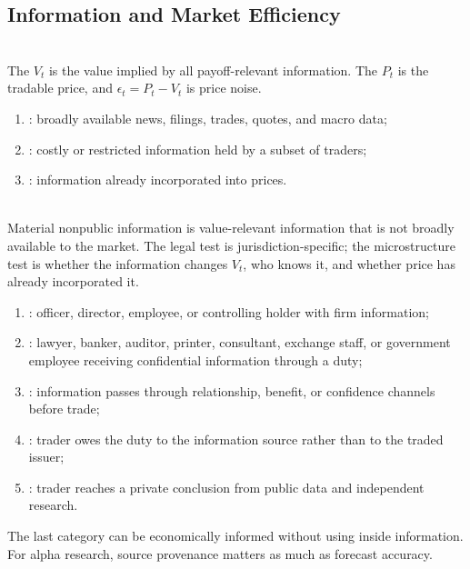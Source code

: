 \subsection{Information and Market Efficiency}

\begin{definition} \\
The  $V_t$ is the value implied by all payoff-relevant information. The  $P_t$ is the tradable price, and $\epsilon_t=P_t-V_t$ is price noise.
\end{definition}

\begin{taxonomy} 
\begin{enumerate}[label=\roman*.]
\setlength{\itemsep}{0pt}
\item {}: broadly available news, filings, trades, quotes, and macro data;
\item {}: costly or restricted information held by a subset of traders;
\item {}: information already incorporated into prices.
\end{enumerate}
\end{taxonomy}

\begin{definition} \\
Material nonpublic information is value-relevant information that is not broadly available to the market. The legal test is jurisdiction-specific; the microstructure test is whether the information changes $V_t$, who knows it, and whether price has already incorporated it.
\end{definition}

\begin{taxonomy} 
\begin{enumerate}[label=\roman*.]
\setlength{\itemsep}{0pt}
\item {}: officer, director, employee, or controlling holder with firm information;
\item {}: lawyer, banker, auditor, printer, consultant, exchange staff, or government employee receiving confidential information through a duty;
\item {}: information passes through relationship, benefit, or confidence channels before trade;
\item {}: trader owes the duty to the information source rather than to the traded issuer;
\item {}: trader reaches a private conclusion from public data and independent research.
\end{enumerate}
The last category can be economically informed without using inside information. For alpha research, source provenance matters as much as forecast accuracy.
\end{taxonomy}


